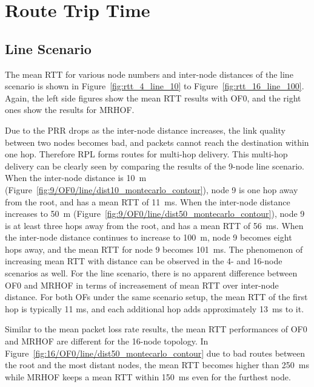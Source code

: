 \section{Route Trip Time}
\label{rtt}

\subsection{Line Scenario}
\label{rtt:line}

The mean RTT for various node numbers and inter-node distances of the line scenario is shown in Figure~\ref{fig:rtt_4_line_10} to Figure~\ref{fig:rtt_16_line_100}. Again, the left side figures show the mean RTT results with OF0, and the right ones show the results for MRHOF.

Due to the PRR drops as the inter-node distance increases, the link quality between two nodes becomes bad, and packets cannot reach the destination within one hop. Therefore RPL forms routes for multi-hop delivery. This multi-hop delivery can be clearly seen by comparing the results of the 9-node line scenario. When the inter-node distance is 10~m (Figure~\ref{fig:9/OF0/line/dist10_montecarlo_contour}), node 9 is one hop away from the root, and has a mean RTT of 11~ms.  When the inter-node distance increases to 50~m (Figure~\ref{fig:9/OF0/line/dist50_montecarlo_contour}), node 9 is at least three hops away from the root, and has a mean RTT of 56~ms.  When the inter-node distance continues to increase to 100~m, node 9 becomes eight hops away, and the mean RTT for node 9 becomes 101~ms.  The phenomenon of increasing mean RTT with distance can be observed in the 4- and 16-node scenarios as well. For the line scenario, there is no apparent difference between OF0 and MRHOF in terms of increasement of mean RTT over inter-node distance. For both OFs under the same scenario setup, the mean RTT of the first hop is typically 11 ms, and each additional hop adds approximately 13~ms to it.

Similar to the mean packet loss rate results, the mean RTT performances of OF0 and MRHOF are different for the 16-node topology. In Figure~\ref{fig:16/OF0/line/dist50_montecarlo_contour} due to bad routes between the root and the most distant nodes, the mean RTT becomes higher than 250~ms while MRHOF keeps a mean RTT within 150~ms even for the furthest node.

